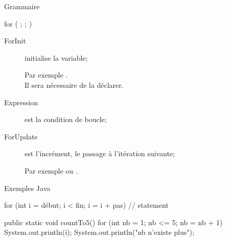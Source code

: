 \begin{frame}[fragile]{Grammaire}
  \begin{grammaire}
        for ( ; ;  )
  \end{grammaire}

  \begin{description}
    \item[ForInit] initialise la variable;

      Par exemple .\\
      Il sera nécessaire de la déclarer.

    \item[Expression] est la condition de boucle;

    \item[ForUpdate] est l'incrément, le passage à l'itération suivante;

      Par exemple  ou .
  \end{description}
\end{frame}

\begin{frame}[fragile]{Exemples Java}
  \begin{java}
for (int i = début; i < fin; i = i + pas){
    // statement
}
  \end{java}
  \pause

  \begin{java}
public static void countTo5() {
    for (int nb = 1; nb <= 5; nb = nb + 1) {
        System.out.println(i);
    }
    System.out.println("nb n'existe plus");
}
  \end{java}
\end{frame}

